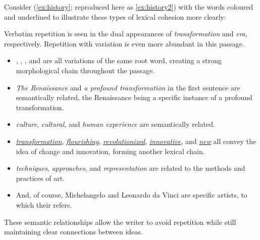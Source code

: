Consider (\ref{ex:history}; reproduced here as \ref{ex:history2}) with the words coloured and underlined to illustrate these types of lexical cohesion more clearly:

\label{ex:history2}
\z
Verbatim repetition is seen in the dual appearances of \textit{\textcolor{xGreen}{transformation}} and \textit{\textcolor{xGreen}{era}}, respectively. Repetition with variation is even more abundant in this passage.

\begin{itemize}[noitemsep]
    \item \textit{}, \textit{}, \textit{}, and \textit{} are all variations of the same root word, creating a strong morphological chain throughout the passage.
    
    \item \textit{\textcolor{xGreen}{The Renaissance}} and \textit{\textcolor{xGreen}{a profound transformation}} in the first sentence are semantically related, the Renaissance being a specific instance of a profound transformation.
    
    \item \textit{\textcolor{xPurple}{culture}}, \textit{\textcolor{xPurple}{cultural}}, and \textit{\textcolor{xPurple}{human experience}} are semantically related.
    
    \item \textit{\uline{transformation}}, \textit{\uline{flourishing}}, \textit{\uline{revolutionized}}, \textit{\uline{innovative}}, and \textit{\uline{new}} all convey the idea of change and innovation, forming another lexical chain.
    
    \item \textit{\textcolor{xPink}{techniques}}, \textit{\textcolor{xPink}{approaches}}, and \textit{\textcolor{xPink}{representation}} are related to the methods and practices of art.

    \item And, of course, \textcolor{xOrange}{Michelangelo} and  \textcolor{xOrange}{Leonardo da Vinci} are specific \textcolor{xOrange}{artists}, to which \textcolor{xOrange}{their} refers.
\end{itemize}
These semantic relationships allow the writer to avoid repetition while still maintaining clear connections between ideas.

